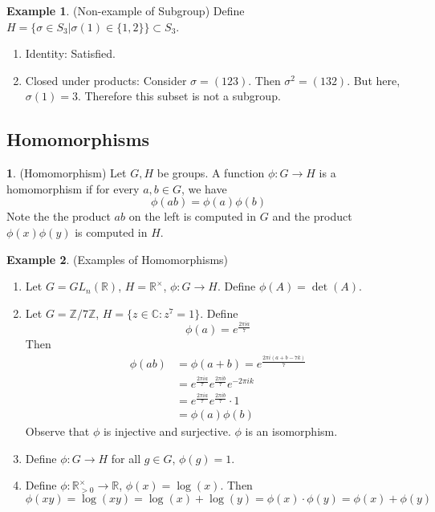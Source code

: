 \documentclass[12pt]{article}
\theoremstyle{definition}
\newtheorem{definition}{\color{NavyBlue}{\textbf{Definition}}}
\newcommand{\R}{\mathbb{R}}
\newtheorem{example}{\color{WildStrawberry}Example}
\theoremstyle{definition}
\begin{document}
\begin{example}(Non-example of Subgroup)
Define $H = \{ \sigma \in S_3 | \sigma(1) \in \{1, 2 \} \} \subset S_3$. 
\begin{enumerate}
	\item Identity: Satisfied.
	\item Closed under products: Consider $\sigma = (1 2 3)$. Then $\sigma^2 = (1 3 2)$. But here, $\sigma(1) = 3$. Therefore this subset is not a subgroup.
\end{enumerate}	
\end{example}

\subsection{Homomorphisms}
\begin{definition}(Homomorphism)
	Let $G, H$ be groups. A function $\phi : G \to H$ is a homomorphism if for every $a,b \in G$, we have 
	\begin{equation}
		\phi(ab) = \phi(a)\phi(b)
	\end{equation}
	Note the the product $ab$ on the left is computed in $G$ and the product $\phi(x)\phi(y)$ is computed in $H$.
\end{definition}

\begin{example}(Examples of Homomorphisms)
\begin{enumerate}
	\item Let $G = GL_n(\mathbb{R})$, $H = \mathbb{R}^{\times}$, $\phi : G \to H$. Define $\phi(A) = \det(A)$.
	\item Let $G = \mathbb{Z} / 7 \mathbb{Z}$, $H = \{z \in \mathbb{C}: z^7 = 1\}$. Define
	\begin{equation}
		\phi(a) = e^{\frac{2\pi i a}{7}}
	\end{equation}
	Then
	\begin{align*}
		\phi(ab) &= \phi(a + b) = e^{\frac{2\pi i (a + b - 7k)}{7}} \\
		&= e^{\frac{2\pi i a}{7}} e^{\frac{2\pi i b}{7}} e^{-2\pi i k}  \\
		&= e^{\frac{2\pi i a}{7}} e^{\frac{2\pi i b}{7}} \cdot 1 \\
		&= \phi(a)\phi(b)
	\end{align*}
	Observe that $\phi$ is injective and surjective. $\phi$ is an isomorphism.
	\item Define $\phi : G \to H$ for all $g \in G$, $\phi(g) = 1$.
	\item Define $\phi : \R^{\times}_{> 0} \to \R$, $\phi(x) = \log(x)$. Then
	\begin{equation}
		\phi(xy) = \log(xy) = \log(x) + \log(y) = \phi(x) \cdot \phi(y) = \phi(x) + \phi(y)
	\end{equation}
\end{enumerate}
\end{example}
\end{document}
